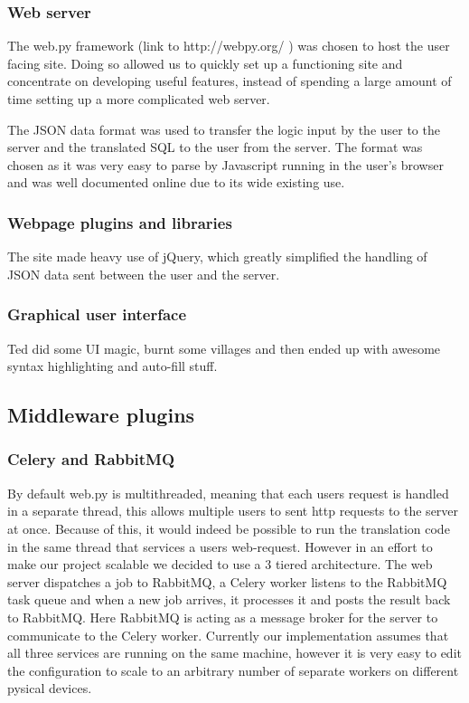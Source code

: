 \documentclass[a4paper, 11pt]{article}
\begin{document}
    \subsubsection{Web server}
      The web.py framework (link to http://webpy.org/ ) was chosen to host the
      user facing site. Doing so allowed us to quickly set up a functioning site
      and concentrate on developing useful features, instead of spending a large
      amount of time setting up a more complicated web server.

      The JSON data format was used to transfer the logic input by the user to the
      server and the translated SQL to the user from the server. The format was
      chosen as it was very easy to parse by Javascript running in the user's
      browser and was well documented online due to its wide existing use.

    \subsubsection{Webpage plugins and libraries}
      The site made heavy use of jQuery, which greatly simplified the handling
      of JSON data sent between the user and the server.  

    \subsubsection{Graphical user interface}
      Ted did some UI magic, burnt some villages and then ended up with awesome
      syntax highlighting and auto-fill stuff.

  \subsection{Middleware plugins}
    \subsubsection{Celery and RabbitMQ}
      By default web.py is multithreaded, meaning that each users request is
      handled in a separate thread, this allows multiple users to sent http
      requests to the server at once. Because of this, it would indeed be
      possible to run the translation code in the same thread that services 
      a users web-request. However in an effort to make our project scalable we
      decided to use a 3 tiered architecture. The web server dispatches a job to
      RabbitMQ, a Celery worker listens to the RabbitMQ task queue and when a
      new job arrives, it processes it and posts the result back to RabbitMQ.
      Here RabbitMQ is acting as a message broker for the server to communicate
      to the Celery worker. Currently our implementation assumes that all three
      services are running on the same machine, however it is very easy to edit
      the configuration to scale to an arbitrary number of separate workers on
      different pysical devices.
\end{document}
